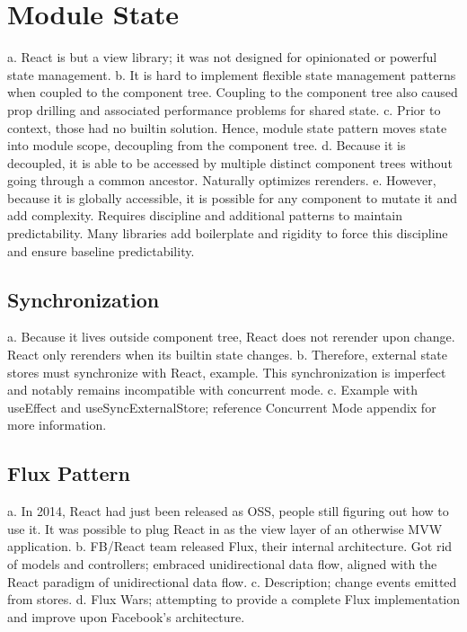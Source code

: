 \documentclass{article}
\begin{document}
\section{Module State}

a. React is but a view library; it was not designed for opinionated or powerful state management.
b. It is hard to implement flexible state management patterns when coupled to the component tree. Coupling to the component tree also caused prop drilling and associated performance problems for shared state.
c. Prior to context, those had no builtin solution. Hence, module state pattern moves state into module scope, decoupling from the component tree.
d. Because it is decoupled, it is able to be accessed by multiple distinct component trees without going through a common ancestor. Naturally optimizes rerenders.
e. However, because it is globally accessible, it is possible for any component to mutate it and add complexity. Requires discipline and additional patterns to maintain predictability. Many libraries add boilerplate and rigidity to force this discipline and ensure baseline predictability.

\subsection{Synchronization}

a. Because it lives outside component tree, React does not rerender upon change. React only rerenders when its builtin state changes.
b. Therefore, external state stores must synchronize with React, example. This synchronization is imperfect and notably remains incompatible with concurrent mode.
c. Example with useEffect and useSyncExternalStore; reference Concurrent Mode appendix for more information.

\subsection{Flux Pattern}

a. In 2014, React had just been released as OSS, people still figuring out how to use it. It was possible to plug React in as the view layer of an otherwise MVW application.
b. FB/React team released Flux, their internal architecture. Got rid of models and controllers; embraced unidirectional data flow, aligned with the React paradigm of unidirectional data flow.
c. Description; change events emitted from stores.
d. Flux Wars; attempting to provide a complete Flux implementation and improve upon Facebook's architecture. 
\end{document}
